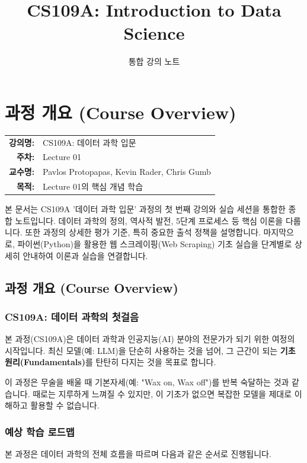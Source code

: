 \documentclass[11pt,a4paper]{book}
\title{\textbf{CS109A: Introduction to Data Science}}
\author{통합 강의 노트}
\date{}
\makeatletter
\theoremstyle{definition}
\newcommand{\metainfo}[4]{
\begin{tcolorbox}[
    colback=lightpurple,
    colframe=darkpurple,
    boxrule=1pt,
    arc=2mm,
    left=10pt,
    right=10pt,
    top=8pt,
    bottom=8pt
]
\begin{tabular}{@{}rl@{}}
\textbf{강의명:} & #1 \\[0.3em]
\textbf{주차:} & #2 \\[0.3em]
\textbf{교수명:} & #3 \\[0.3em]
\textbf{목적:} & \begin{minipage}[t]{0.75\textwidth}#4\end{minipage}
\end{tabular}
\end{tcolorbox}
}
\makeatother
\begin{document}
\maketitle
\tableofcontents


\chapter{과정 개요 (Course Overview)}
\label{ch:lecture1}

\metainfo{CS109A: 데이터 과학 입문}{Lecture 01}{Pavlos Protopapas, Kevin Rader, Chris Gumb}{Lecture 01의 핵심 개념 학습}


\begin{summarybox}
본 문서는 CS109A '데이터 과학 입문' 과정의 첫 번째 강의와 실습 세션을 통합한 종합 노트입니다. 데이터 과학의 정의, 역사적 발전, 5단계 프로세스 등 핵심 이론을 다룹니다.
또한 과정의 상세한 평가 기준, 특히 중요한 출석 정책을 설명합니다.
마지막으로, 파이썬(Python)을 활용한 웹 스크레이핑(Web Scraping) 기초 실습을 단계별로 상세히 안내하여 이론과 실습을 연결합니다.
\end{summarybox}


\section{과정 개요 (Course Overview)}

\subsection{CS109A: 데이터 과학의 첫걸음}
본 과정(CS109A)은 데이터 과학과 인공지능(AI) 분야의 전문가가 되기 위한 여정의 시작입니다. 최신 모델(예: LLM)을 단순히 사용하는 것을 넘어, 그 근간이 되는 \textbf{기초 원리(Fundamentals)}를 탄탄히 다지는 것을 목표로 합니다.

이 과정은 무술을 배울 때 기본자세(예: "Wax on, Wax off")를 반복 숙달하는 것과 같습니다. 때로는 지루하게 느껴질 수 있지만, 이 기초가 없으면 복잡한 모델을 제대로 이해하고 활용할 수 없습니다.

\subsection{예상 학습 로드맵}
본 과정은 데이터 과학의 전체 흐름을 따르며 다음과 같은 순서로 진행됩니다.
\end{document}
